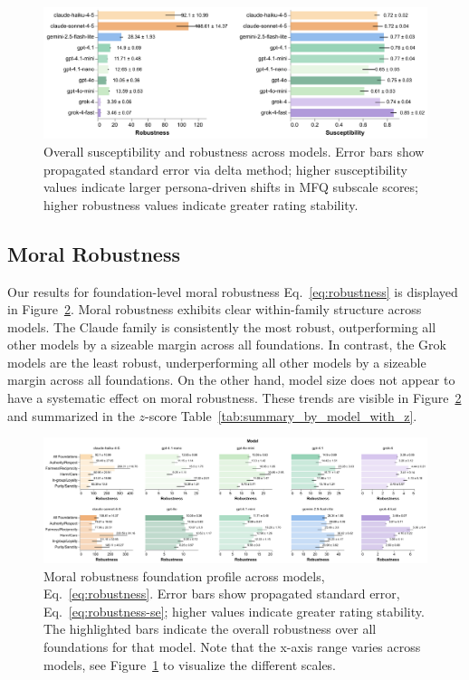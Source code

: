\documentclass{article}
\begin{document}
\begin{figure}[!t]
  \centering
  \includegraphics[width=0.9\linewidth]{../results/moral_metrics_overall_bars.pdf}\hfill
  \caption{Overall susceptibility and robustness across models. Error bars show propagated standard error via delta method; higher susceptibility values indicate larger persona-driven shifts in MFQ subscale scores; higher robustness values indicate greater rating stability.}
  \label{fig:overall}
\end{figure}



\subsection{Moral Robustness}

Our results for foundation-level moral robustness Eq.~\eqref{eq:robustness} is displayed in Figure~\ref{fig:robustness}. Moral robustness exhibits clear within-family structure across models. The Claude family is consistently the most robust, outperforming all other models by a sizeable margin across all foundations. In contrast, the Grok models are the least robust, underperforming all other models by a sizeable margin across all foundations. On the other hand, model size does not appear to have a systematic effect on moral robustness. These trends are visible in Figure~\ref{fig:robustness} and summarized in the $z$-score Table~\ref{tab:summary_by_model_with_z}.

\begin{figure}[!t]
  \centering
  \includegraphics[width=0.9\linewidth]{../results/robustness_bars.pdf}\hfill
  \caption{Moral robustness foundation profile across models, Eq.~\eqref{eq:robustness}. Error bars show propagated standard error, Eq.~\eqref{eq:robustness-se}; higher values indicate greater rating stability. The highlighted bars indicate the overall robustness over all foundations for that model. Note that the x-axis range varies across models, see Figure~\ref{fig:overall} to visualize the different scales.}
  \label{fig:robustness}
\end{figure}
\end{document}
